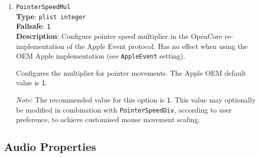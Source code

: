 \documentclass[]{article}
\begin{document}
\begin{enumerate}
  Configures the divisor for pointer movements. The Apple OEM default value is \texttt{1}.
  \texttt{0} is an invalid value for this option.

  \emph{Note}: The recommended value for this option is \texttt{1}. This value may
  optionally be modified in combination with \texttt{PointerSpeedMul}, according to user
  preference, to achieve customised mouse movement scaling.

\item
  \texttt{PointerSpeedMul}\\
  \textbf{Type}: \texttt{plist\ integer}\\
  \textbf{Failsafe}: \texttt{1}\\
  \textbf{Description}: Configure pointer speed multiplier in the OpenCore re-implementation
  of the Apple Event protocol.
  Has no effect when using the OEM Apple implementation (see \texttt{AppleEvent} setting).

  Configures the multiplier for pointer movements. The Apple OEM default value is \texttt{1}.

  \emph{Note}: The recommended value for this option is \texttt{1}. This value may
  optionally be modified in combination with \texttt{PointerSpeedDiv}, according to user
  preference, to achieve customised mouse movement scaling.

\end{enumerate}

\subsection{Audio Properties}\label{uefiaudioprops}
\end{document}
